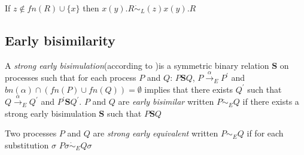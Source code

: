 \begin{example}
  If $z\notin fn(R)\cup \{x\}$ then $x(y).R \dot{\sim}_{L} (z)x(y).R$
\end{example}



\subsection{Early bisimilarity}

\begin{definition}
  A \emph{strong early bisimulation}(according to \cite{parrow})is a symmetric binary relation $\mathbf{S}$ on processes such that for each process $P$ and $Q$: $P\mathbf{S} Q$, $P \xrightarrow{\alpha}_{E} P^{'}$ and $bn(\alpha) \cap (fn(P) \cup fn(Q))=\emptyset$ implies that there exists $Q^{'}$ such that $Q \xrightarrow{\alpha}_{E} Q^{'}$ and $P^{'}\mathbf{S}Q^{'}$. $P$ and $Q$ are \emph{early bisimilar} written $P\dot{\sim}_{E}Q$ if there exists a strong early bisimulation $\mathbf{S}$ such that $P\mathbf{S}Q$
\end{definition}

\begin{definition}
  Two processes $P$ and $Q$ are \emph{strong early equivalent} written $P\sim_{E}Q$ if for each substitution $\sigma$ $P\sigma \dot{\sim}_{E}Q\sigma$
\end{definition}


% 

% 


